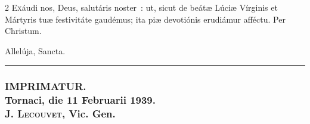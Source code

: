 \documentclass[9pt,twoside]{extarticle}
\begin{document}
\begin{multicols}{2}
\lettrine{E}xáudi nos, Deus, salutáris noster~: ut, sicut de beátæ Lúciæ Vírginis et Mártyris tuæ festivitáte gaudémus; ita piæ devotiónis erudiámur afféctu. Per Christum.

\begin{tightlist}{}
\item {\small {}}
\item {\small {} Allelúja, Sancta.}
\end{tightlist}

\end{multicols}

\begin{center}\textcolor{red}{\rule{\linewidth}{0.5pt}} \end{center}
\vfill
\subsubsection*{\center \normalfont IMPRIMATUR.\\
Tornaci, die 11 Februarii 1939.\\
\textsc{J. Lecouvet}, Vic. Gen.}
\vfill

\fancyhead[C]{}
\fancyfoot[C]{}
\cleardoublepage
{}
\renewcommand{\thepage}{\arabic{page}*}
\end{document}
